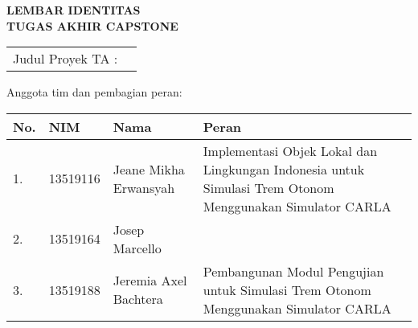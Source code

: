 \clearpage
\pagestyle{empty}

\begin{center}
	\smallskip

	\Large \bfseries \MakeUppercase{
		Lembar Identitas \\
		Tugas Akhir Capstone
	}
	\vspace{0.5cm}

	\raggedright
	\begin{table}[h!]
		\large \bfseries
		\begin{tabular}{p{} p{}}
			Judul Proyek TA : & \capstoneTitle
		\end{tabular}
	\end{table}

	\normalsize \normalfont

	Anggota tim dan pembagian peran:

	\begin{table}[h!]
		\begin{tabular}{|p{} | p{} | p{} | p{}|}
			\hline
			\textbf{No.} & \textbf{NIM} & \textbf{Nama}         & \textbf{Peran}                                                                                                 \\
			\hline
			1.           & 13519116     & Jeane Mikha Erwansyah & Implementasi Objek Lokal dan Lingkungan Indonesia untuk Simulasi Trem Otonom Menggunakan Simulator CARLA \\
			\hline
			2.           & 13519164     & Josep Marcello        & \thetitle                                 \\
			\hline
			3.           & 13519188     & Jeremia Axel Bachtera & Pembangunan Modul Pengujian untuk Simulasi Trem Otonom Menggunakan Simulator CARLA \\
			\hline
		\end{tabular}
	\end{table}

	\vfill
	\pembimbingTtd

\end{center}
\clearpage
